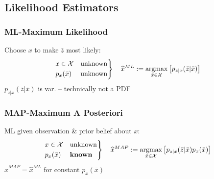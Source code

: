 \subsection{Likelihood Estimators}
\subsubsection{ML-Maximum Likelihood}
Choose $x$ to make $\bar{z}$ most likely:
\begin{align*}
    \begin{drcases}
        x\in\mathcal{X} & \mathrm{unknown} \\
        p_x(\bar{x}) & \mathrm{unknown}
    \end{drcases}
    \quad
    \widehat{x}^{ML} := \mathop{\mathrm{argmax}}_{\bar{x}\in\mathcal{X}}
    \left[ p_{z|x}(\bar{z}|\bar{x}) \right]
\end{align*}
$p_{z|x}(\bar{z}|\bar{x})$ is var. --  technically not a PDF
\subsubsection{MAP-Maximum A Posteriori}
\vspace{0.3em}
ML given observation \& prior belief about $x$:
\begin{align*}
    \begin{drcases}
        x\in\mathcal{X} & \mathrm{unknown} \\
        p_x(\bar{x}) & \textbf{known}
    \end{drcases}
    \quad
    \widehat{x}^{MAP} := \mathop{\mathrm{argmax}}_{\bar{x}\in\mathcal{X}}
    \left[ p_{z|x}(\bar{z}|\bar{x}) p_x(\bar{x}) \right]
\end{align*}
$\hat{x}^{MAP} = \hat{x}^{ML}$ for constant $p_x(\bar{x})$
